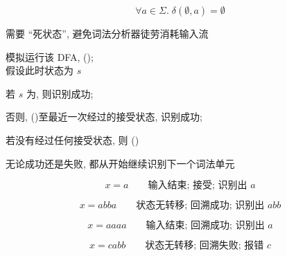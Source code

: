 \begin{frame}{}
  \begin{center}

    \[
      \forall a \in \Sigma.\; \delta(\emptyset, a) = \emptyset
    \]

    需要 ``死状态'', 避免词法分析器徒劳消耗输入流
  \end{center}
\end{frame}

\begin{frame}{}
  \begin{center}
    模拟运行该 DFA,  (); \\[3pt]
    假设此时状态为 $s$


    \pause
    若 $s$ 为, 则识别成功;

    \pause
    \vspace{0.30cm}
    否则,  ()至最近一次经过的接受状态, 识别成功;

    \pause
    \vspace{0.30cm}
    若没有经过任何接受状态, 则 ()

    \pause
    \vspace{0.30cm}
    无论成功还是失败, 都从开始继续识别下一个词法单元
  \end{center}
\end{frame}

\begin{frame}

  \[
    x = a \qquad \text{输入结束; 接受; 识别出 $a$}
  \]

  \pause
  \vspace{-0.40cm}
  \[
    x = abba \qquad \text{状态无转移; 回溯成功; 识别出 $abb$}
  \]

  \pause
  \vspace{-0.40cm}
  \[
    x = aaaa \qquad \text{输入结束; 回溯成功; 识别出 $a$}
  \]

  \pause
  \vspace{-0.40cm}
  \[
    x = cabb \qquad \text{状态无转移; 回溯失败; 报错 $c$}
  \]
\end{frame}


